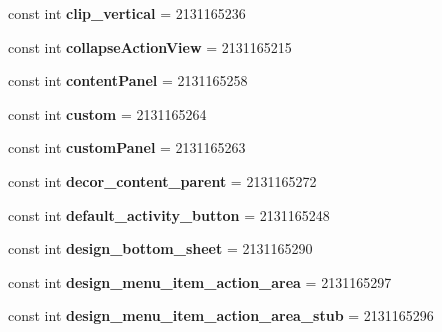 \begin{DoxyCompactItemize}
\mbox{\label{classXaria_1_1Resource_1_1Id_ad394896a415558d09d32e8abe93916b8}} 
const int {\bfseries clip\+\_\+vertical} = 2131165236
\item 
\mbox{\label{classXaria_1_1Resource_1_1Id_aba312a92c7ad9891c56791a22b13a9f6}} 
const int {\bfseries collapse\+Action\+View} = 2131165215
\item 
\mbox{\label{classXaria_1_1Resource_1_1Id_acf35c7bcce6663802f3cb628f37578e9}} 
const int {\bfseries content\+Panel} = 2131165258
\item 
\mbox{\label{classXaria_1_1Resource_1_1Id_af416c1e8619cf8f712365c32b1b730a7}} 
const int {\bfseries custom} = 2131165264
\item 
\mbox{\label{classXaria_1_1Resource_1_1Id_adf4146a89e3d8993351796c04876d004}} 
const int {\bfseries custom\+Panel} = 2131165263
\item 
\mbox{\label{classXaria_1_1Resource_1_1Id_ac7f1067c9f2d00dd1c408ae725dc6b0a}} 
const int {\bfseries decor\+\_\+content\+\_\+parent} = 2131165272
\item 
\mbox{\label{classXaria_1_1Resource_1_1Id_ad14a6fd696f01a117721ed4e452dc6ac}} 
const int {\bfseries default\+\_\+activity\+\_\+button} = 2131165248
\item 
\mbox{\label{classXaria_1_1Resource_1_1Id_ac6723aa6102e62e3f6465e47aecb69eb}} 
const int {\bfseries design\+\_\+bottom\+\_\+sheet} = 2131165290
\item 
\mbox{\label{classXaria_1_1Resource_1_1Id_a9ba1e4a75fd011611e37b02efcf63345}} 
const int {\bfseries design\+\_\+menu\+\_\+item\+\_\+action\+\_\+area} = 2131165297
\item 
\mbox{\label{classXaria_1_1Resource_1_1Id_a7e3e7bd2149fb7a3d1e7581bfee9cc6e}} 
const int {\bfseries design\+\_\+menu\+\_\+item\+\_\+action\+\_\+area\+\_\+stub} = 2131165296

\end{DoxyCompactItemize}
